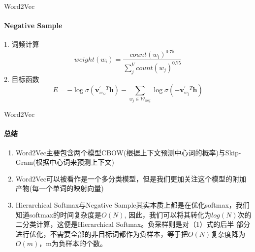 \documentclass{beamer}
\begin{document}
\begin{frame}{Word2Vec}
    \framesubtitle{Negative Sample}
    1. 词频计算
    $$
        weight(w_i) = \frac{count(w_i)^{0.75}}{\sum_{j}^{V} count(w_j)^{0.75}}
    $$
    2. 目标函数
    $$
        E=-\log \sigma\left(\mathbf{v}_{w_{O}}^{\prime}{ }^{T} \mathbf{h}\right)-\sum_{w_{j} \in \mathcal{W}_{\mathrm{neg}}} \log \sigma\left(-\mathbf{v}_{w_{j}}^{\prime}{ }^{T} \mathbf{h}\right)
    $$
\end{frame}
\begin{frame}{Word2Vec}
    \framesubtitle{总结}
    \begin{enumerate}
        \item Word2Vec主要包含两个模型CBOW(根据上下文预测中心词的概率)与Skip-Gram(根据中心词来预测上下文)
        \item Word2Vec可以被看作是一个多分类模型，但是我们更加关注这个模型的附加产物(每一个单词的映射向量)
        \item Hierarchical Softmax与Negative Sample其实本质上都是在优化softmax，我们知道softmax的时间复杂度是$O(N)$,
              因此，我们可以将其转化为$log(N)$次的二分类计算，这便是Hierarchical Softmax。负采样则是对（1）式的后半
              部分进行优化，不需要全部的非目标词都作为负样本，等于把$O(N)$复杂度降为$O(m)$，m为负样本的个数。
    \end{enumerate}
\end{frame}
\end{document}
